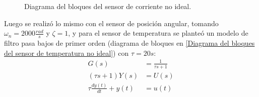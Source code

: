 \documentclass[a4paper, 10pt, onecolumn,journal]{ieeeconf}
\begin{document}
\begin{figure}[H]
	\centering
	\begin{adjustbox}{max width=\columnwidth}
	\end{adjustbox}
	\caption{Diagrama del bloques del sensor de corriente no ideal.}
	\label{Diagrama del bloques del sensor de corriente no ideal}
\end{figure}
Luego se realizó lo mismo con el sensor de posición angular, tomando $\omega_n=2000\frac{rad}{s}$ y $\zeta = 1$, y para el sensor de temperatura se planteó un modelo de filtro pasa bajos de primer orden (diagrama de bloques en \cref{Diagrama del bloques del sensor de temperatura no ideal}) con $\tau=20 s$:
\begin{align}
	G(s) &= \frac{1}{\tau s + 1}\\
	\left(\tau s + 1 \right) Y(s)&=U(s)\\
	\tau \frac{d y(t)}{dt} +  y(t) &= u(t) 
\end{align}
\end{document}
